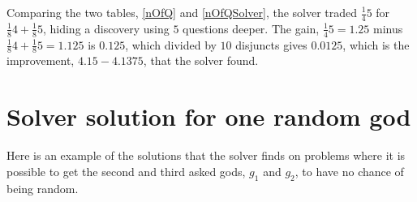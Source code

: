 \documentclass[twoside,twocolumn,a4paper,11pt]{article}
\theoremstyle{definition}
\begin{document}
Comparing the two tables, \eqref{nOfQ} and \eqref{nOfQSolver}, the solver traded
$\frac{1}{4}5$ for $\frac{1}{8}4 + \frac{1}{8}5$, 
hiding a discovery using $5$ questions deeper. 
The gain, 
$\frac{1}{4}5 = 1.25$ minus $\frac{1}{8}4 + \frac{1}{8}5 = 1.125$ is
$0.125$, which divided by $10$ disjuncts gives $0.0125$, which is the improvement,
$4.15-4.1375$, that the solver found.




\section{Solver solution for one random god}
\label{app:oneR}
Here is an example of the solutions that the solver finds on problems 
where it is possible to get the second and third asked gods, $g_1$ and $g_2$,
to have no chance of being random.
\end{document}
